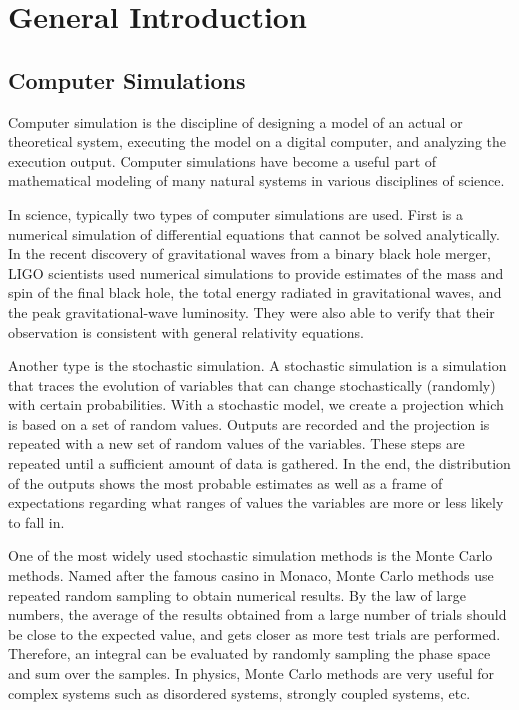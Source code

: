 \chapter{General Introduction}
\section{Computer Simulations}
Computer simulation is the discipline of designing a model of an actual or 
theoretical system, executing the model on a digital computer, and 
analyzing the execution output. Computer simulations have become a useful part of mathematical modeling of 
many natural systems in various disciplines of science. 

In science, typically two types of computer simulations are used. First is a 
numerical simulation of differential equations that cannot be solved 
analytically. In the recent discovery of gravitational waves from a binary
black hole merger, LIGO scientists used numerical simulations to provide 
estimates of the mass and spin of the final black hole, the total energy 
radiated in gravitational waves, and the peak gravitational-wave luminosity.
They were also able to verify that their observation is consistent with general 
relativity equations.

Another type is the stochastic simulation. A stochastic simulation is a 
simulation that traces the evolution of variables that can change stochastically
 (randomly) with certain probabilities. With a stochastic model, we create a 
projection which is based on a set of  random values. 
Outputs are recorded and the projection is repeated with a new 
set of random values of the variables. These steps are repeated until a 
sufficient amount of data is gathered. In the end, the distribution of the 
outputs shows the most probable estimates as well as a frame of expectations 
regarding what ranges of values the variables are more or less likely to fall 
in. 

One of the most widely used stochastic simulation methods is the Monte Carlo
methods. Named after the famous casino in Monaco, Monte Carlo methods use
repeated random sampling to obtain numerical results. By the law of large 
numbers, the average of the results obtained from a large number of trials
should be close to the expected value, and gets closer as more test trials
are performed. Therefore, an integral can be evaluated by randomly sampling
the phase space and sum over the samples. 
In physics, Monte Carlo methods are very useful for complex systems such as 
disordered systems, strongly coupled systems, etc. 

